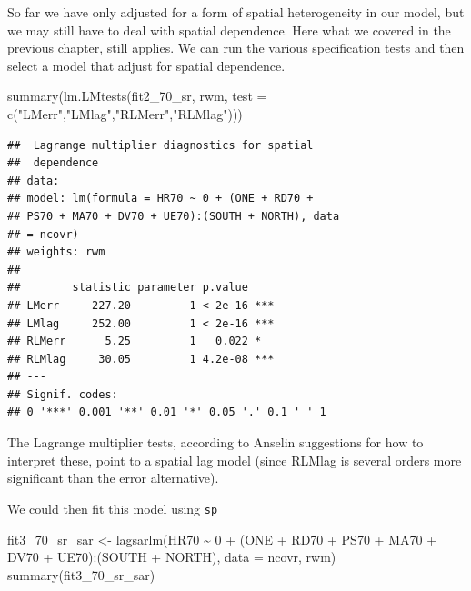 \documentclass[
  krantz2]{krantz}
\makeatletter
\newenvironment{Shaded}{\begin{snugshade}}{\end{snugshade}}
\newcommand{\AttributeTok}[1]{\textcolor[rgb]{0.61,0.61,0.61}{#1}}
\newcommand{\DecValTok}[1]{\textcolor[rgb]{0.06,0.06,0.06}{#1}}
\newcommand{\FunctionTok}[1]{\textcolor[rgb]{0,0,0}{#1}}
\newcommand{\NormalTok}[1]{#1}
\newcommand{\OtherTok}[1]{\textcolor[rgb]{0.37,0.37,0.37}{#1}}
\newcommand{\SpecialCharTok}[1]{\textcolor[rgb]{0,0,0}{#1}}
\newcommand{\StringTok}[1]{\textcolor[rgb]{0.5,0.5,0.5}{#1}}
\newenvironment{kframe}{%
\medskip{}
\setlength{\fboxsep}{.8em}
 \def\at@end@of@kframe{}%
 \ifinner\ifhmode%
  \def\at@end@of@kframe{\end{minipage}}%
  \begin{minipage}{\columnwidth}%
 \fi\fi%
 \def\FrameCommand##1{\hskip\@totalleftmargin \hskip-\fboxsep
 \colorbox{shadecolor}{##1}\hskip-\fboxsep
     \hskip-\linewidth \hskip-\@totalleftmargin \hskip\columnwidth}%
 \MakeFramed {\advance\hsize-\width
   \@totalleftmargin\z@ \linewidth\hsize
   \@setminipage}}%
 {\par\unskip\endMakeFramed%
 \at@end@of@kframe}
\renewenvironment{Shaded}{\begin{kframe}}{\end{kframe}}
\makeatother
\begin{document}
So far we have only adjusted for a form of spatial heterogeneity in our model, but we may still have to deal with spatial dependence. Here what we covered in the previous chapter, still applies. We can run the various specification tests and then select a model that adjust for spatial dependence.

\begin{Shaded}
\begin{Highlighting}[]
\FunctionTok{summary}\NormalTok{(}\FunctionTok{lm.LMtests}\NormalTok{(fit2\_70\_sr, rwm, }\AttributeTok{test =} \FunctionTok{c}\NormalTok{(}\StringTok{"LMerr"}\NormalTok{,}\StringTok{"LMlag"}\NormalTok{,}\StringTok{"RLMerr"}\NormalTok{,}\StringTok{"RLMlag"}\NormalTok{)))}
\end{Highlighting}
\end{Shaded}

\begin{verbatim}
##  Lagrange multiplier diagnostics for spatial
##  dependence
## data:  
## model: lm(formula = HR70 ~ 0 + (ONE + RD70 +
## PS70 + MA70 + DV70 + UE70):(SOUTH + NORTH), data
## = ncovr)
## weights: rwm
##  
##        statistic parameter p.value    
## LMerr     227.20         1 < 2e-16 ***
## LMlag     252.00         1 < 2e-16 ***
## RLMerr      5.25         1   0.022 *  
## RLMlag     30.05         1 4.2e-08 ***
## ---
## Signif. codes:  
## 0 '***' 0.001 '**' 0.01 '*' 0.05 '.' 0.1 ' ' 1
\end{verbatim}

The Lagrange multiplier tests, according to Anselin suggestions for how to interpret these, point to a spatial lag model (since RLMlag is several orders more significant than the error alternative).

We could then fit this model using \texttt{sp}

\begin{Shaded}
\begin{Highlighting}[]
\NormalTok{fit3\_70\_sr\_sar }\OtherTok{\textless{}{-}} \FunctionTok{lagsarlm}\NormalTok{(HR70 }\SpecialCharTok{\textasciitilde{}} \DecValTok{0} \SpecialCharTok{+}\NormalTok{ (ONE }\SpecialCharTok{+}\NormalTok{ RD70 }\SpecialCharTok{+}\NormalTok{ PS70 }\SpecialCharTok{+}\NormalTok{ MA70 }\SpecialCharTok{+}\NormalTok{ DV70 }\SpecialCharTok{+}\NormalTok{ UE70)}\SpecialCharTok{:}\NormalTok{(SOUTH }\SpecialCharTok{+}\NormalTok{ NORTH), }\AttributeTok{data =}\NormalTok{ ncovr, rwm)}
\FunctionTok{summary}\NormalTok{(fit3\_70\_sr\_sar)}
\end{Highlighting}
\end{Shaded}
\end{document}
